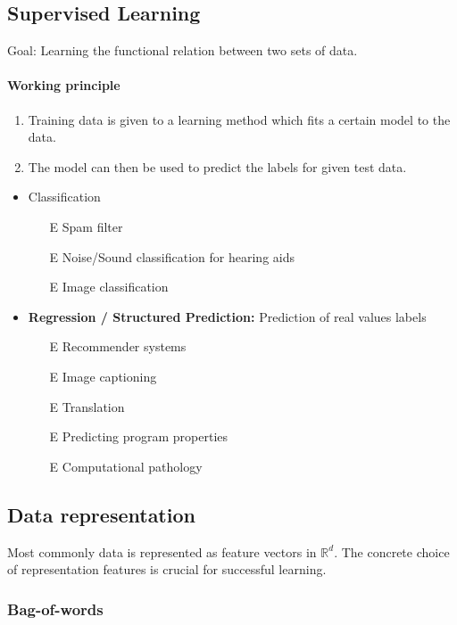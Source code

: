 \documentclass[10pt,a4paper]{scrartcl}
\begin{document}
\begin{multicols*}{2}
\section{Supervised Learning}


Goal: Learning the functional relation between two sets of data.

\paragraph{Working principle}

\begin{enumerate}
\item Training data is given to a learning method which fits a certain model to the data.
\item The model can then be used to predict the labels for given test data.
\end{enumerate}

\begin{itemize}
\item Classification
\begin{itemize}
\item[E] Spam filter
\item[E] Noise/Sound classification for hearing aids
\item[E] Image classification
\end{itemize}
\item \textbf{Regression / Structured Prediction:} Prediction of real values labels
\begin{itemize}
\item[E] Recommender systems
\item[E] Image captioning
\item[E] Translation
\item[E] Predicting program properties
\item[E] Computational pathology
\end{itemize}
\end{itemize}

\subsection{Data representation}

Most commonly data is represented as feature vectors in $\mathbb{R}^d$. The concrete choice of representation features is crucial for successful learning.

\subsubsection{Bag-of-words}


\end{multicols*}
\end{document}

